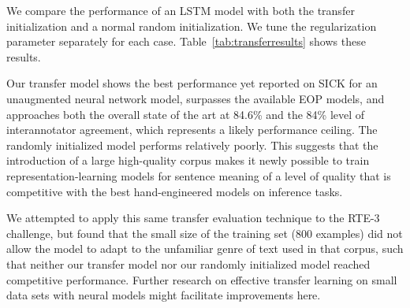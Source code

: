We compare the performance of an LSTM model with both the transfer initialization and a normal random initialization. We tune the regularization parameter separately for each case. Table~\ref{tab:transferresults} shows these results. 

Our transfer model shows the best performance yet reported on SICK for an unaugmented neural network model, surpasses the available EOP models, and approaches both the overall state of the art at 84.6\% \cite{lai2014illinois} and the 84\% level of interannotator agreement, which represents a likely performance ceiling. The randomly initialized model performs relatively poorly. This suggests that the introduction of a large high-quality corpus makes it newly possible to train representation-learning models for sentence meaning of a level of quality that is competitive with the best hand-engineered models on inference tasks.

We attempted to apply this same transfer evaluation technique to the RTE-3 challenge, but found that the small size of the training set (800 examples) did not allow the model to adapt to the unfamiliar genre of text used in that corpus, such that neither our transfer model nor our randomly initialized model reached competitive performance.
Further research on effective transfer learning on small data sets with neural models might facilitate improvements here.



